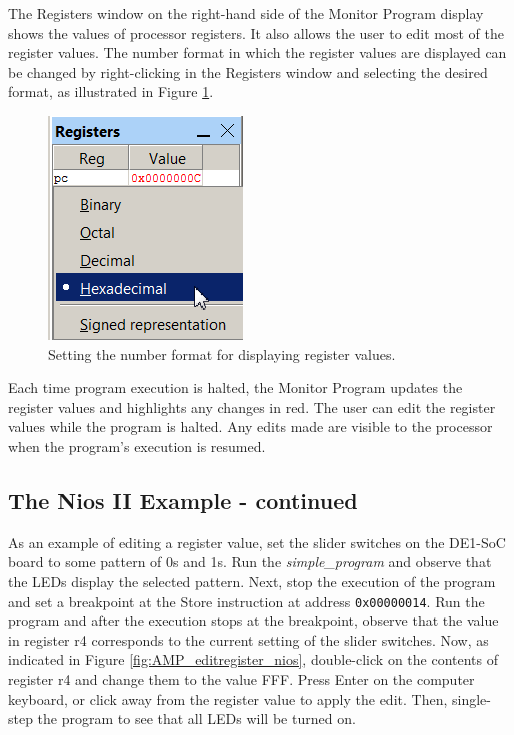 \documentclass[11pt, twoside, pdftex]{article}
\begin{document}
The \textsf{Registers} window on the right-hand side of the
Monitor Program display shows the values of processor registers.
It also allows the user to edit most of the register values. 
The number format in which the register values are displayed
can be changed by right-clicking in the \textsf{Registers}
window and selecting the desired format, as illustrated in 
Figure \ref{fig:AMP_registeroptions}.

\begin{figure}[H]
   \begin{center}
      \includegraphics[scale=1]{screenshots/figure33.png}
   \end{center}
   \caption{Setting the number format for displaying register values.} 
   \label{fig:AMP_registeroptions}
\end{figure}

Each time program execution is halted, the Monitor Program
updates the register values and highlights any changes in red.
The user can edit the register values while the program is
halted. Any edits made are visible to the processor when the
program's execution is resumed.

\subsection{The Nios II Example - continued}
\label{tut:nios_5}

As an example of editing a register value, set the slider
switches on the DE1-SoC board to some pattern of 0s and 1s.
Run the {\it simple\_program} and observe that the LEDs display
the selected pattern. Next, stop the execution of the program
and set a breakpoint at the Store instruction
at address \texttt{0x00000014}. Run the program and
after the execution stops at the breakpoint, observe that the
value in register r4 corresponds to the current setting of the
slider switches. 
Now,  as indicated in Figure \ref{fig:AMP_editregister_nios}, double-click on the contents of
register r4 and change them to the value FFF.  
Press \textsf{Enter} on the computer keyboard, or click away from
the register value to apply the edit. 
Then, single-step the program to see that all LEDs will be
turned on. 
\end{document}
